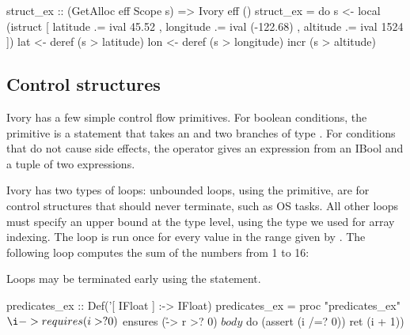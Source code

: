 \begin{code}

struct_ex :: (GetAlloc eff \mytilde Scope s) => Ivory eff ()
struct_ex = do
  s <- local (istruct [ latitude .= ival 45.52
                      , longitude .= ival (-122.68)
                      , altitude .= ival 1524 ])
  lat <- deref (s \mytilde> latitude)
  lon <- deref (s \mytilde> longitude)
  incr (s \mytilde> altitude)
\end{code}


\subsection{Control structures}

Ivory has a few simple control flow primitives. For boolean conditions,
the  primitive is a statement that takes an  and two
branches of type . For conditions that do not cause side
effects, the  operator gives an expression from an IBool and a tuple
of two expressions.


Ivory has two types of loops: unbounded loops, using the  primitive,
are for control structures that should never terminate, such as OS tasks. All
other loops must specify an upper bound at the type level, using the  type
we used for array indexing. The  loop is run once for every value
in the range given by . The following loop computes the sum of the
numbers from 1 to 16:


Loops may be terminated early using the  statement.

\begin{code}
predicates_ex :: Def('[ IFloat ] :-> IFloat)
predicates_ex = proc "predicates_ex" $
    \i -> requires (i >? 0)
        $ ensures (\r -> r >? 0)
        $ body
        $ do (assert (i /=? 0))
             ret (i + 1))
\end{code}

